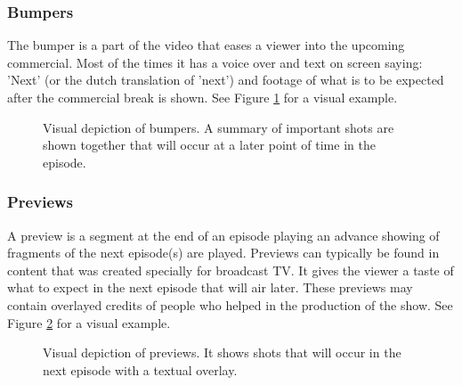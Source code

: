 \documentclass{report}
\begin{document}
\subsubsection{Bumpers}
The bumper is a part of the video that eases a viewer into the upcoming commercial. Most of the times it has a voice over and text on screen saying: 'Next' (or the dutch translation of 'next') and footage of what is to be expected after the commercial break is shown. See Figure \ref{fig:contextbumpers} for a visual example.

\begin{figure}[H]
	\caption{Visual depiction of bumpers. A summary of important shots are shown together that will occur at a later point of time in the episode.}
	\label{fig:contextbumpers}
\end{figure}

\subsubsection{Previews}
A preview is a segment at the end of an episode playing an advance showing of fragments of the next episode(s) are played. Previews can typically be found in content that was created specially for broadcast TV. It gives the viewer a taste of what to expect in the next episode that will air later. These previews may contain overlayed credits of people who helped in the production of the show. See Figure \ref{fig:contextpreviews} for a visual example.

\begin{figure}[H]
	\caption{Visual depiction of previews. It shows shots that will occur in the next episode with a textual overlay.}
	\label{fig:contextpreviews}
\end{figure}
\end{document}
